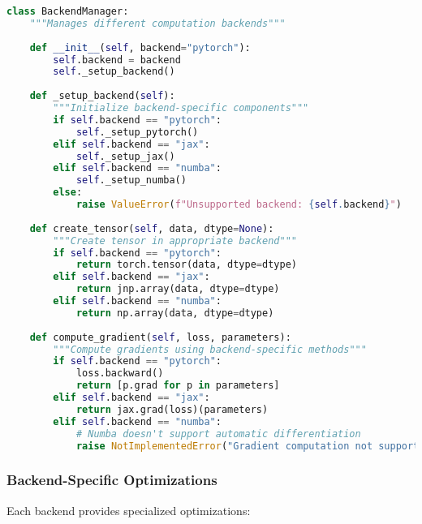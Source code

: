 \begin{lstlisting}[language=Python, caption=Backend Manager]
class BackendManager:
    """Manages different computation backends"""
    
    def __init__(self, backend="pytorch"):
        self.backend = backend
        self._setup_backend()
    
    def _setup_backend(self):
        """Initialize backend-specific components"""
        if self.backend == "pytorch":
            self._setup_pytorch()
        elif self.backend == "jax":
            self._setup_jax()
        elif self.backend == "numba":
            self._setup_numba()
        else:
            raise ValueError(f"Unsupported backend: {self.backend}")
    
    def create_tensor(self, data, dtype=None):
        """Create tensor in appropriate backend"""
        if self.backend == "pytorch":
            return torch.tensor(data, dtype=dtype)
        elif self.backend == "jax":
            return jnp.array(data, dtype=dtype)
        elif self.backend == "numba":
            return np.array(data, dtype=dtype)
    
    def compute_gradient(self, loss, parameters):
        """Compute gradients using backend-specific methods"""
        if self.backend == "pytorch":
            loss.backward()
            return [p.grad for p in parameters]
        elif self.backend == "jax":
            return jax.grad(loss)(parameters)
        elif self.backend == "numba":
            # Numba doesn't support automatic differentiation
            raise NotImplementedError("Gradient computation not supported in Numba backend")
\end{lstlisting}

\subsubsection{Backend-Specific Optimizations}

Each backend provides specialized optimizations:

